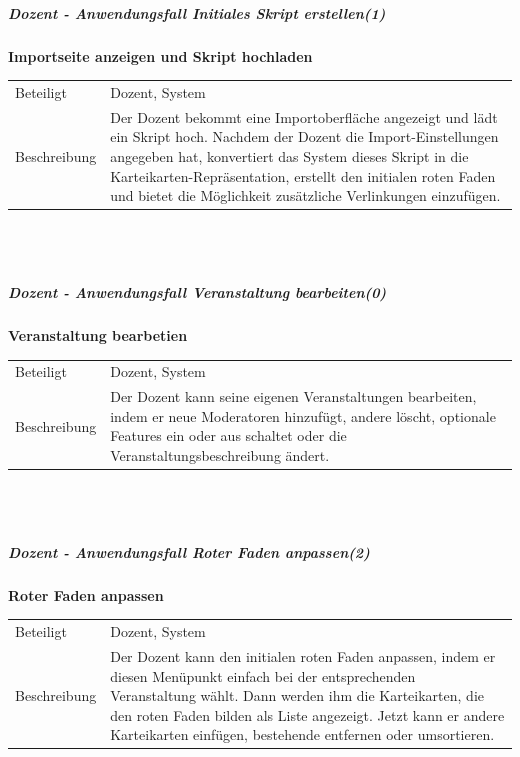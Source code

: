 \documentclass[12pt,a4paper]{article}
\begin{document}
{\subparagraph{Dozent - Anwendungsfall \glqq Initiales Skript erstellen\grqq (1)}\mbox{}

\textbf{Importseite anzeigen und Skript hochladen}\\
\begin{tabular}{l|p{12cm}}
\hline 
Beteiligt & Dozent, System \\ 
Beschreibung & Der Dozent bekommt eine Importoberfläche angezeigt und lädt ein Skript hoch. Nachdem der Dozent die Import-Einstellungen angegeben hat, konvertiert das System dieses Skript in die Karteikarten-Repräsentation, erstellt den initialen roten Faden und bietet die Möglichkeit zusätzliche Verlinkungen einzufügen. \\ 
\end{tabular}\\\\

\newpage

\subparagraph{Dozent - Anwendungsfall \glqq Veranstaltung bearbeiten\grqq (0)}\mbox{}

\textbf{Veranstaltung bearbetien}\\
\begin{tabular}{l|p{12cm}}
\hline 
Beteiligt & Dozent, System \\ 
Beschreibung & Der Dozent kann seine eigenen Veranstaltungen bearbeiten, indem er neue Moderatoren hinzufügt, andere löscht, optionale Features ein oder aus schaltet oder die Veranstaltungsbeschreibung ändert. \\ 
\end{tabular}\\\\


\subparagraph{Dozent - Anwendungsfall \glqq Roter Faden anpassen\grqq (2)}\mbox{}

\textbf{Roter Faden anpassen}\\
\begin{tabular}{l|p{12cm}}
\hline 
Beteiligt & Dozent, System \\ 
Beschreibung & Der Dozent kann den initialen roten Faden anpassen, indem er diesen Menüpunkt einfach bei der entsprechenden Veranstaltung wählt. Dann werden ihm die Karteikarten, die den roten Faden bilden als Liste angezeigt. Jetzt kann er andere Karteikarten einfügen, bestehende entfernen oder umsortieren. \\ 
\end{tabular}\\\\


}
\end{document}

